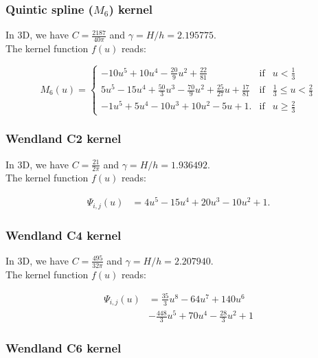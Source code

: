 \documentclass[a4paper]{mnras}
\begin{document}
\subsubsection{Quintic spline ($M_6$) kernel}

In 3D, we have $C=\frac{2187}{40\pi}$ and $\gamma=H/h = 2.195775$.\\
The kernel function $f(u)$ reads:

\begin{equation}
  M_6(u) = \left\lbrace\begin{array}{rcl}
  -10u^5 + 10u^4 - \frac{20}{9}u^2 + \frac{22}{81} & \mbox{if} & u < \frac{1}{3} \\
  5u^5 - 15u^4 + \frac{50}{3}u^3 - \frac{70}{9}u^2 + \frac{25}{27}u + \frac{17}{81} &  \mbox{if} &  \frac{1}{3} \leq u < \frac{2}{3}\\
  -1u^5 + 5u^4 - 10u^3 + 10u^2 - 5u + 1. & \mbox{if} & u \geq \frac{2}{3}
  \end{array}
  \right.
    \nonumber
\end{equation}


\subsubsection{Wendland C2 kernel}

In 3D, we have $C=\frac{21}{2\pi}$ and $\gamma=H/h = 1.936492$.\\
The kernel function $f(u)$ reads:

\begin{align}
  \Psi_{i,j}(u) &= 4u^5 - 15u^4 + 20u^3 - 10u^2 + 1.
    \nonumber
\end{align}


\subsubsection{Wendland C4 kernel}

In 3D, we have $C=\frac{495}{32\pi}$ and $\gamma=H/h = 2.207940$.\\
The kernel function $f(u)$ reads:

\begin{align}
  \Psi_{i,j}(u) &= \frac{35}{3}u^8 - 64u^7 + 140u^6\\
  & - \frac{448}{3}u^5 + 70u^4 - \frac{28}{3}u^2 + 1
    \nonumber
\end{align}


\subsubsection{Wendland C6 kernel}
\end{document}
